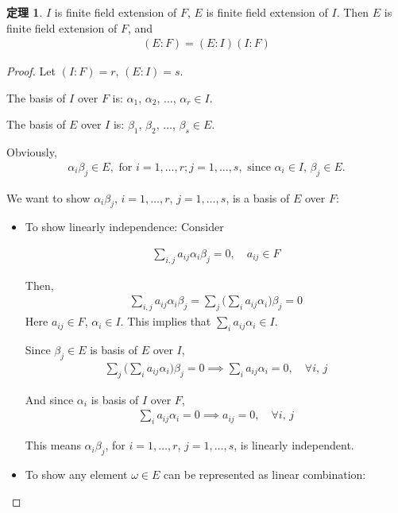 \documentclass[utf8]{ctexbook}
\theoremstyle{definition}
\newtheorem{prototheorem}{定理}[section]
\newenvironment{theorem}
   {\colorlet{shadecolor}{red!30}\begin{shaded}\begin{prototheorem}}
   {\end{prototheorem}\end{shaded}}
\begin{document}
\begin{theorem}
\label{theorem_4_3_1_finite_extension_transitivity}
$I$ is finite field extension of $F$, $E$ is finite field extension of $I$. Then $E$ is finite field extension of $F$, and
\begin{align*}
(E:F) = (E: I) (I:F)
\end{align*}
\end{theorem}

\begin{proof}
Let $(I:F) = r$, $(E: I) = s$.

The basis of $I$ over $F$ is: $\alpha_1$, $\alpha_2$, $\ldots$, $\alpha_r \in I$.

The basis of $E$ over $I$ is: $\beta_1$, $\beta_2$, $\ldots$, $\beta_s \in E$.

Obviously,
\begin{align*}
\alpha_i \beta_j \in E, \mbox{ for } i = 1, \ldots, r; j = 1, \ldots, s, \mbox{ since } \alpha_i \in I, \, \beta_j \in E .
\end{align*} 

We want to show $\alpha_i \beta_j$, $i = 1, \ldots, r$, $j = 1, \ldots, s $, is a basis of $E$ over $F$:
\begin{itemize}
\item{To show linearly independence:
Consider

\begin{align*}
\sum_{i,j} a_{ij} \alpha_i \beta_j = 0, \quad a_{ij} \in F
\end{align*}

Then,
\begin{align*}
\sum_{i,j} a_{ij} \alpha_i \beta_j = \sum_j \bigg( \sum_i a_{ij} \alpha_i \bigg) \beta_j = 0
\end{align*}
Here $a_{ij} \in F$, $\alpha_i \in I$. This implies that $\sum_i a_{ij} \alpha_i \in I $.

Since $\beta_j \in E$ is basis of $E$ over $I$, 
\begin{align*}
\sum_j \bigg( \sum_i a_{ij} \alpha_i \bigg) \beta_j = 0 \implies \sum_i a_{ij} \alpha_i = 0, \quad \forall i,\, j
\end{align*}

And since $\alpha_i$ is basis of $I$ over $F$,
\begin{align*}
\sum_i a_{ij} \alpha_i = 0 \implies a_{ij} = 0, \quad \forall i,\, j
\end{align*}

This means $\alpha_i \beta_j$, for $i= 1, \ldots, r$, $j = 1, \ldots, s$, is linearly independent.
}
\item{To show any element $\omega \in E$ can be represented as linear combination:

}
\end{itemize}
\end{proof}
\end{document}

